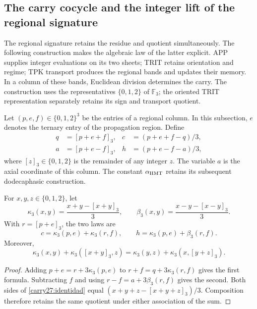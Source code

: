 \subsection{The carry cocycle and the integer lift of the regional signature}
\label{carry27:seccion}

The regional signature retains the residue and quotient simultaneously.
The following construction makes the algebraic law of the latter
explicit. APP supplies integer evaluations on its two sheets;
TRIT retains orientation and regime; TPK transport produces the
regional bands and updates their memory. In a column of these
bands, Euclidean division determines the carry. The construction
uses the representatives \(\{0,1,2\}\) of \(\mathbb F_3\);
the oriented TRIT representation separately retains its sign
and transport quotient.

Let \((p,e,f)\in\{0,1,2\}^3\) be the entries of a regional
column. In this subsection, \(e\) denotes the ternary entry
of the propagation region. Define
\begin{equation}
\begin{aligned}
q&=[p+e+f]_3,& c&=(p+e+f-q)/3,\\
a&=[p+e-f]_3,& h&=(p+e-f-a)/3,
\end{aligned}
\label{carry27:division}
\end{equation}
where \([z]_3\in\{0,1,2\}\) is the remainder of any integer
\(z\). The variable \(a\) is the axial coordinate of this
column. The constant \(\alpha_{\rm HMT}\) retains its
subsequent dodecaphasic construction.

\begin{proposition}
\label{carry27:cociclo}
For \(x,y,z\in\{0,1,2\}\), let
\[
\kappa_3(x,y)=\frac{x+y-[x+y]_3}{3},\qquad
\beta_3(x,y)=\frac{x-y-[x-y]_3}{3}.
\]
With \(r=[p+e]_3\), the two laws are
\[
c=\kappa_3(p,e)+\kappa_3(r,f),\qquad
h=\kappa_3(p,e)+\beta_3(r,f).
\]
Moreover,
\begin{equation}
\kappa_3(x,y)+\kappa_3([x+y]_3,z)
=\kappa_3(y,z)+\kappa_3(x,[y+z]_3).
\label{carry27:identidad}
\end{equation}
\end{proposition}

\begin{proof}
Adding \(p+e=r+3\kappa_3(p,e)\) to
\(r+f=q+3\kappa_3(r,f)\) gives the first formula.
Subtracting \(f\) and using
\(r-f=a+3\beta_3(r,f)\) gives the second.
Both sides of \eqref{carry27:identidad} equal
\((x+y+z-[x+y+z]_3)/3\). Composition therefore retains
the same quotient under either association of the sum.
\end{proof}

